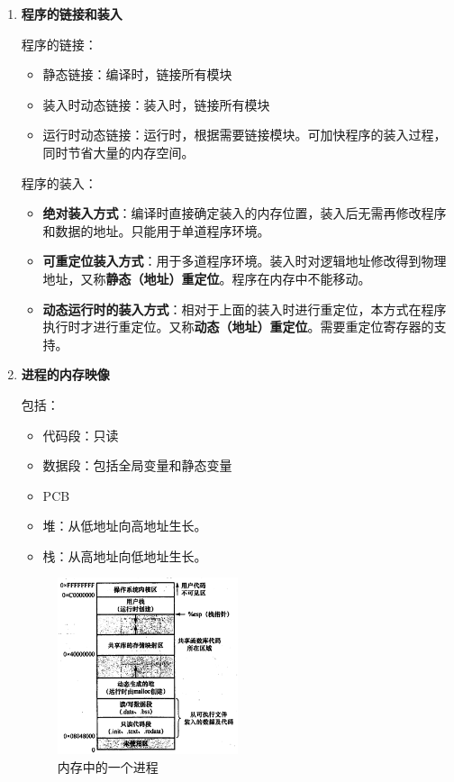 \documentclass[12pt, a4paper, oneside]{ctexart}
\begin{document}
\begin{enumerate}
  \item {\bf 程序的链接和装入}
  
  程序的链接：
  \begin{itemize}
    \item 静态链接：编译时，链接所有模块
    \item 装入时动态链接：装入时，链接所有模块
    \item 运行时动态链接：运行时，根据需要链接模块。可加快程序的装入过程，同时节省大量的内存空间。
  \end{itemize}
  
  程序的装入：
  \begin{itemize}
    \item \textbf{绝对装入方式}：编译时直接确定装入的内存位置，装入后无需再修改程序和数据的地址。只能用于单道程序环境。
    \item \textbf{可重定位装入方式}：用于多道程序环境。装入时对逻辑地址修改得到物理地址，又称\textbf{静态（地址）重定位}。程序在内存中不能移动。
    \item \textbf{动态运行时的装入方式}：相对于上面的装入时进行重定位，本方式在程序执行时才进行重定位。又称\textbf{动态（地址）重定位}。需要重定位寄存器的支持。
  \end{itemize}

  \item {\bf 进程的内存映像}
  
  包括：
  \begin{itemize}
    \item 代码段：只读
    \item 数据段：包括全局变量和静态变量
    \item PCB
    \item 堆：从低地址向高地址生长。
    \item 栈：从高地址向低地址生长。
  \end{itemize}
  
  \begin{figure}
    \centering
    \includegraphics[width=0.5\textwidth]{./images/process_in_memory.png}
    \caption{内存中的一个进程}
  \end{figure}


\end{enumerate}
\end{document}
